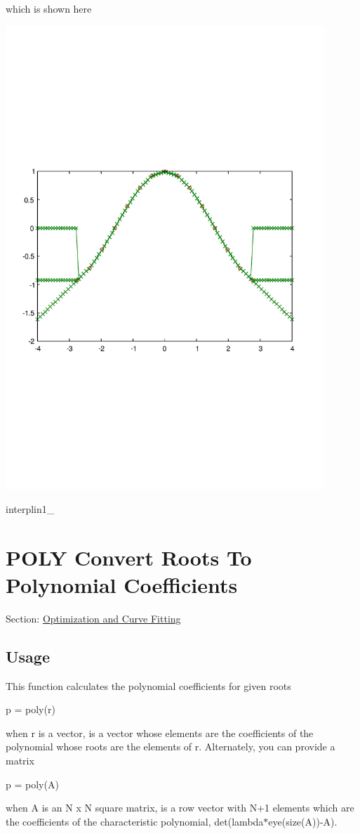 which is shown here  
\begin{DoxyImage}
\includegraphics[width=12cm]{interplin1_2}
\caption{interplin1\-\_}
\end{DoxyImage}
 \hypertarget{curvefit_poly}{}\section{P\-O\-L\-Y Convert Roots To Polynomial Coefficients}\label{curvefit_poly}
Section\-: \hyperlink{sec_curvefit}{Optimization and Curve Fitting} \hypertarget{vtkwidgets_vtkxyplotwidget_Usage}{}\subsection{Usage}\label{vtkwidgets_vtkxyplotwidget_Usage}
This function calculates the polynomial coefficients for given roots \begin{DoxyVerb}    p = poly(r)
\end{DoxyVerb}
 when {\ttfamily r} is a vector, is a vector whose elements are the coefficients of the polynomial whose roots are the elements of {\ttfamily r}. Alternately, you can provide a matrix \begin{DoxyVerb}    p = poly(A)
\end{DoxyVerb}
 when {\ttfamily A} is an {\ttfamily N x N} square matrix, is a row vector with {\ttfamily N+1} elements which are the coefficients of the characteristic polynomial, {\ttfamily det(lambda$\ast$eye(size(\-A))-\/\-A)}.

